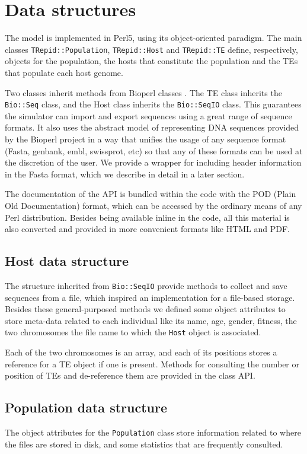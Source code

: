 \documentclass[10pt]{article}
\begin{document}
\section{Data structures}
The model is implemented in Perl5, using its object-oriented
paradigm. The main classes \verb|TRepid::Population|,
\verb|TRepid::Host| and \verb|TRepid::TE| define, respectively,
objects for the population, the hosts that constitute the population
and the TEs that populate each host genome.

Two classes inherit methods from Bioperl classes \cite{SBB+02}. The TE
class inherits the \verb|Bio::Seq| class, and the Host class inherits
the \verb|Bio::SeqIO| class. This guarantees the simulator can import
and export sequences using a great range of sequence formats. It also
uses the abstract model of representing DNA sequences provided by the
Bioperl project in a way that unifies the usage of any sequence format
(Fasta, genbank, embl, swissprot, etc) so that any of these formats
can be used at the discretion of the user. We provide a wrapper for
including header information in the Fasta format, which we describe in
detail in a later section.

The documentation of the API is bundled within the code with the POD
(Plain Old Documentation) format, which can be accessed by the
ordinary means of any Perl distribution. Besides being available
inline in the code, all this material is also converted and provided
in more convenient formats like HTML and PDF.

\subsection{Host data structure}
The structure inherited from \verb|Bio::SeqIO| provide methods to
collect and save sequences from a file, which inspired an
implementation for a file-based storage. Besides these
general-purposed methods we defined some object attributes to store
meta-data related to each individual like its name, age, gender,
fitness, the two chromosomes the file name to which the \verb|Host|
object is associated.

Each of the two chromosomes is an array, and each of its positions
stores a reference for a TE object if one is present. Methods for
consulting the number or position of TEs and de-reference them are
provided in the class API.

\subsection{Population data structure}
The object attributes for the \verb|Population| class store
information related to where the files are stored in disk, and some
statistics that are frequently consulted.
\end{document}
